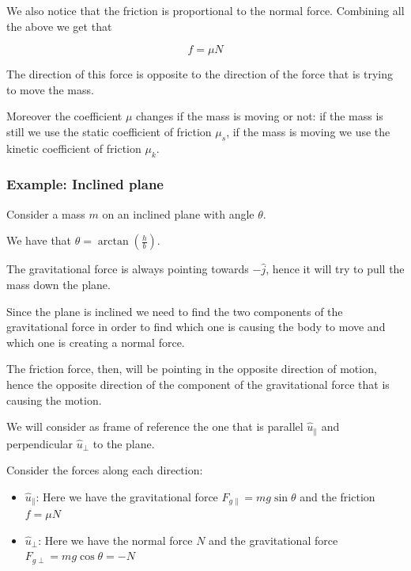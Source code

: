 \documentclass[10pt]{extarticle}
\begin{document}
We also notice that the friction is proportional to the normal force. Combining all the above we get that

$$
    f = \mu N
$$

The direction of this force is opposite to the direction of the force that is trying to move the mass.

Moreover the coefficient $\mu$ changes if the mass is moving or not: if the mass is still we use the static coefficient of friction $\mu_s$, if the mass is moving we use the kinetic coefficient of friction $\mu_k$.

\subsubsection{Example: Inclined plane}

\begin{center}
\end{center}

Consider a mass $m$ on an inclined plane with angle $\theta$.

We have that $\theta = \arctan\left(\frac{h}{b}\right)$.

The gravitational force is always pointing towards $-\hat j$, hence it will try to pull the mass down the plane.

Since the plane is inclined we need to find the two components of the gravitational force in order to find which one is causing the body to move and which one is creating a normal force.

The friction force, then, will be pointing in the opposite direction of motion, hence the opposite direction of the component of the gravitational force that is causing the motion.

We will consider as frame of reference the one that is parallel $\hat u_{\parallel}$ and perpendicular $\hat u_{\perp}$ to the plane.

Consider the forces along each direction:

\begin{itemize}
    \item $\hat u_{\parallel}$:
          Here we have the gravitational force $F_{g\parallel} = mg \sin \theta$ and the friction $f = \mu N$
    \item $\hat u_{\perp}$: Here we have the normal force $N$ and the gravitational force $F_{g\perp} = mg \cos \theta = - N$
\end{itemize}
\end{document}
